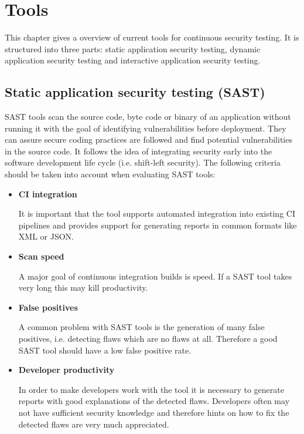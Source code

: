 \documentclass[conference]{IEEEtran}
\begin{document}
\newpage

\section{Tools}

This chapter gives a overview of current tools for continuous security testing. It is structured into three parts: static application security testing, dynamic application security testing and interactive application security testing.

\subsection{Static application security testing (SAST)}

SAST tools scan the source code, byte code or binary of an application without running it with the goal of identifying vulnerabilities before deployment. They can assure secure coding practices are followed and find potential vulnerabilities in the source code. It follows the idea of integrating security early into the software development life cycle (i.e. shift-left security). The following criteria should be taken into account when evaluating SAST tools: \\

\begin{itemize}
	\item \textbf{CI integration}
	
	It is important that the tool supports automated integration into existing CI pipelines and provides support for generating reports in common formats like XML or JSON.
	
	\item \textbf{Scan speed}
	
	A major goal of continuous integration builds is speed. If a SAST tool takes very long this may kill productivity.
	
	\item \textbf{False positives}
	
	A common problem with SAST tools is the generation of many false positives, i.e. detecting flaws which are no flaws at all. Therefore a good SAST tool should have a low false positive rate.
	
	\item \textbf{Developer productivity}
	
	In order to make developers work with the tool it is necessary to generate reports with good explanations of the detected flaws. Developers often may not have sufficient security knowledge and therefore hints on how to fix the detected flaws are very much appreciated.
\end{itemize}
\end{document}
